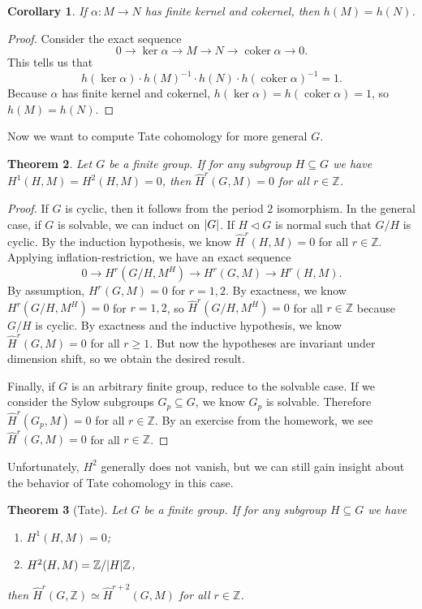 \documentclass[leqno, openany]{memoir}
\newtheorem{thm}{Theorem}[section]
\newtheorem{cor}[thm]{Corollary}
\theoremstyle{definition}
\theoremstyle{remark}
\theoremstyle{plain}
\theoremstyle{definition}
\theoremstyle{remark}
\newcommand{\Z}{\mathbb{Z}}
\newcommand{\wh}[1]{\widehat{#1}}
\DeclareMathOperator{\coker}{coker}
\begin{document}
\begin{cor}
    If $\alpha \colon M \to N$ has finite kernel and cokernel, then $h(M) = h(N)$.
\end{cor}

\begin{proof}
    Consider the exact sequence
    \[ 0 \to \ker \alpha \to M \to N \to \coker \alpha \to 0. \]
    This tells us that 
    \[ h(\ker \alpha) \cdot { h(M) }^{-1} \cdot h(N) \cdot { h(\coker \alpha) }^{-1} = 1. \]
    Because $\alpha$ has finite kernel and cokernel, $h(\ker \alpha) = h(\coker \alpha) = 1$, so $h(M) = h(N)$.
\end{proof}

Now we want to compute Tate cohomology for more general $G$.

\begin{thm}
    Let $G$ be a finite group. If for any subgroup $H \subseteq G$ we have $H^1(H, M) = H^2(H, M) = 0$, then $\wh{H}^r(G, M) = 0$ for all $r \in \Z$.
\end{thm}

\begin{proof}
    If $G$ is cyclic, then it follows from the period $2$ isomorphism. In the general case, if $G$ is solvable, we can induct on $\abs{G}$. If $H \triangleleft G$ is normal such that $G/H$ is cyclic. By the induction hypothesis, we know $\wh{H}^r(H, M) = 0$ for all $r \in \Z$. Applying inflation-restriction, we have an exact sequence
    \[ 0 \to H^r(G/H, M^H) \to H^r(G, M) \to H^r(H, M). \]
    By assumption, $H^r(G, M) = 0$ for $r = 1,2$. By exactness, we know $H^r(G/H, M^H) = 0$ for $r = 1,2$, so $\wh{H}^r(G/H, M^H) = 0$ for all $r \in \Z$ because $G/H$ is cyclic. By exactness and the inductive hypothesis, we know $\wh{H}^r(G, M) = 0$ for all $r \geq 1$. But now the hypotheses are invariant under dimension shift, so we obtain the desired result.

    Finally, if $G$ is an arbitrary finite group, reduce to the solvable case. If we consider the Sylow subgroups $G_p \subseteq G$, we know $G_p$ is solvable. Therefore $\wh{H}^r(G_p, M) = 0$ for all $r \in \Z$. By an exercise from the homework, we see $\wh{H}^r(G, M) = 0$ for all $r \in \Z$.
\end{proof}

Unfortunately, $H^2$ generally does not vanish, but we can still gain insight about the behavior of Tate cohomology in this case.

\begin{thm}[Tate]
    Let $G$ be a finite group. If for any subgroup $H \subseteq G$ we have
    \begin{enumerate}
        \item $H^1(H, M) = 0$;
        \item $H^2(H, M) = \Z/\abs{H} \Z$,
    \end{enumerate}
    then $\wh{H}^r(G, \Z) \simeq \wh{H}^{r+2}(G, M)$ for all $r \in \Z$.
\end{thm}
\end{document}
